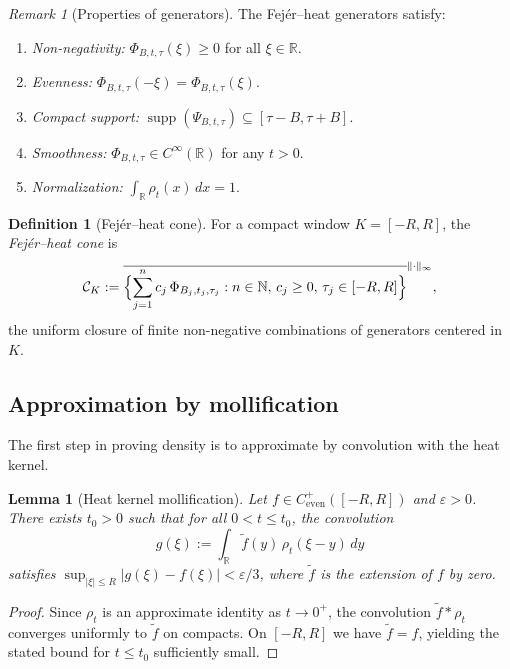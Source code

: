 \documentclass[11pt,a4paper]{article}
\newtheorem{lemma}[theorem]{Lemma}
\theoremstyle{definition}
\newtheorem{definition}[theorem]{Definition}
\theoremstyle{remark}
\newtheorem{remark}[theorem]{Remark}
\newcommand{\R}{\mathbb{R}}
\newcommand{\N}{\mathbb{N}}
\DeclareMathOperator{\supp}{supp}
\begin{document}
\begin{remark}[Properties of generators]\label{rem:gen-props}
The Fej\'er--heat generators satisfy:
\begin{enumerate}[label=(\roman*)]
\item \emph{Non-negativity:} $\Phi_{B,t,\tau}(\xi) \geq 0$ for all $\xi \in \R$.
\item \emph{Evenness:} $\Phi_{B,t,\tau}(-\xi) = \Phi_{B,t,\tau}(\xi)$.
\item \emph{Compact support:} $\supp(\Psi_{B,t,\tau}) \subseteq [\tau - B, \tau + B]$.
\item \emph{Smoothness:} $\Phi_{B,t,\tau} \in C^\infty(\R)$ for any $t > 0$.
\item \emph{Normalization:} $\int_\R \rho_t(x)\, dx = 1$.
\end{enumerate}
\end{remark}

\begin{definition}[Fej\'er--heat cone]\label{def:FH-cone}
For a compact window $K = [-R, R]$, the \emph{Fej\'er--heat cone} is
\begin{equation}\label{eq:cone}
  \mathcal{C}_K := \overline{\Bigl\{\sum_{j=1}^n c_j\, \Phi_{B_j, t_j, \tau_j} : n \in \N,\, c_j \geq 0,\, \tau_j \in [-R, R]\Bigr\}}^{\|\cdot\|_\infty},
\end{equation}
the uniform closure of finite non-negative combinations of generators centered in $K$.
\end{definition}

\subsection{Approximation by mollification}

The first step in proving density is to approximate by convolution with the heat kernel.

\begin{lemma}[Heat kernel mollification]\label{lem:mollify}
Let $f \in C^+_{\mathrm{even}}([-R,R])$ and $\varepsilon > 0$. There exists $t_0 > 0$ such that for all $0 < t \leq t_0$, the convolution
\begin{equation}\label{eq:mollify}
  g(\xi) := \int_\R \tilde{f}(y)\, \rho_t(\xi - y)\, dy
\end{equation}
satisfies $\sup_{|\xi| \leq R} |g(\xi) - f(\xi)| < \varepsilon/3$, where $\tilde{f}$ is the extension of $f$ by zero.
\end{lemma}

\begin{proof}
Since $\rho_t$ is an approximate identity as $t \to 0^+$, the convolution $\tilde{f} * \rho_t$ converges uniformly to $\tilde{f}$ on compacts. On $[-R, R]$ we have $\tilde{f} = f$, yielding the stated bound for $t \leq t_0$ sufficiently small.
\end{proof}
\end{document}
